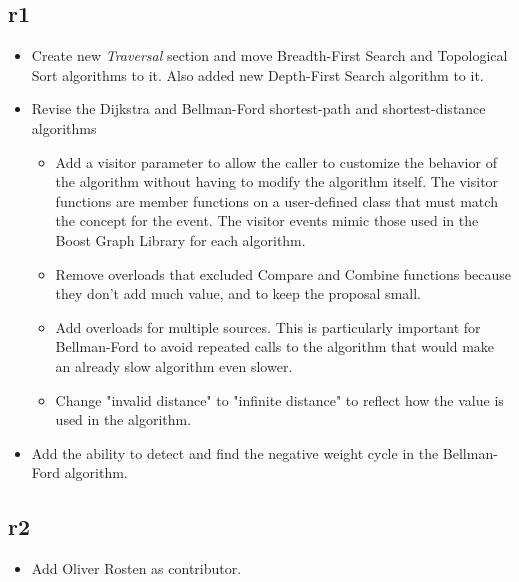 \subsection*{\paperno r1}
\begin{itemize}
      \item Create new \textit{Traversal} section and move Breadth-First Search and Topological Sort algorithms to it.
            Also added new Depth-First Search algorithm to it.
      \item Revise the Dijkstra and Bellman-Ford shortest-path and shortest-distance algorithms
            \begin{itemize}
                  \item Add a visitor parameter to allow the caller to
                        customize the behavior of the algorithm without having to modify the algorithm itself.
                        The visitor functions are member functions on a user-defined class that must match the concept for the event.
                        The visitor events mimic those used in the Boost Graph Library for each algorithm.
                  \item Remove overloads that excluded Compare and Combine functions because they don't add much value,
                        and to keep the proposal small.
                  \item Add overloads for multiple sources. This is particularly important for Bellman-Ford to avoid
                        repeated calls to the algorithm that would make an already slow algorithm even slower.
                  \item Change "invalid distance" to "infinite distance" to reflect how the value is used 
                        in the algorithm.
            \end{itemize}
      \item Add the ability to detect and find the negative weight cycle in the Bellman-Ford algorithm.
\end{itemize}

\subsection*{\paperno r2}
\begin{itemize}
      \item Add Oliver Rosten as contributor.
\end{itemize}

